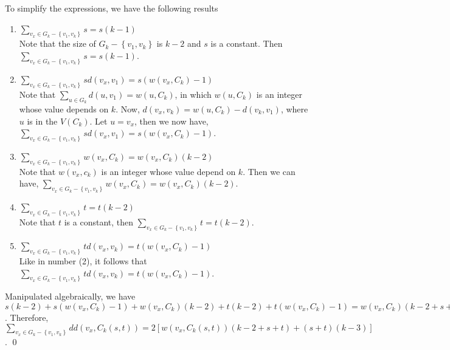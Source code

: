 To simplify the expressions, we have the following results
\begin{enumerate}
\item $\sum_{v_x\in G_k-\left\lbrace v_1,v_k\right\rbrace}s=s(k-1)$\\
Note that the size of $G_k-\left\lbrace v_1,v_k\right\rbrace$ is $k-2$ and $s$ is a constant. Then $\sum_{v_x\in G_k-\left\lbrace v_1,v_k\right\rbrace}s=s(k-1)$.  
\item $\sum_{v_x\in G_k-\left\lbrace v_1,v_k\right\rbrace}sd(v_x,v_1)=s(w(v_x,C_k)-1)$\\
Note that $\sum_{u\in G_k}d(u,v_1)=w(u,C_k)$, in which $w(u,C_k)$ is an integer whose value depends on $k$. Now, $d(v_x,v_k)=w(u,C_k)-d(v_k,v_1)$, where $u$ is in the $V(C_k)$. Let $u=v_x$, then we now have, $\sum_{v_x\in G_k-\left\lbrace v_1,v_k\right\rbrace}sd(v_x,v_1)=s(w(v_x,C_k)-1)$. 
\item $\sum_{v_x\in G_k-\left\lbrace v_1,v_k\right\rbrace}w(v_x,C_k)=w(v_x,C_k)(k-2)$\\
Note that $w(v_x,c_k)$ is an integer whose value depend on $k$. Then we can have, $\sum_{v_x\in G_k-\left\lbrace v_1,v_k\right\rbrace}w(v_x,C_k)=w(v_x,C_k)(k-2)$.
\item $\sum_{v_x\in G_k-\left\lbrace v_1,v_k\right\rbrace}t=t(k-2)$\\
Note that $t$ is a constant, then $\sum_{v_x\in G_k-\left\lbrace v_1,v_k\right\rbrace}t=t(k-2)$.
\item $\sum_{v_x\in G_k-\left\lbrace v_1,v_k\right\rbrace}td(v_x,v_k)=t(w(v_x,C_k)-1)$\\
Like in number (2), it follows that $\sum_{v_x\in G_k-\left\lbrace v_1,v_k\right\rbrace}td(v_x,v_k)=t(w(v_x,C_k)-1)$. 
\end{enumerate}

Manipulated algebraically, we have $s(k-2)+s(w(v_x,C_k)-1)+w(v_x,C_k)(k-2)+t(k-2)+t(w(v_x,C_k)-1)=w(v_x,C_k)(k-2+s+t)+(k-3)(s+t)$. Therefore, $\sum_{v_x\in G_k-\left\lbrace v_1,v_k\right\rbrace}dd(v_x,C_k(s,t))=2\left[ w(v_x,C_k(s,t))(k-2+s+t)+(s+t)(k-3)\right]$. \qed    

